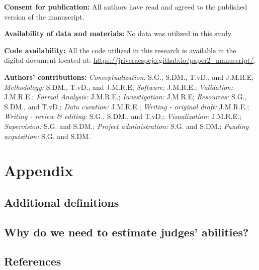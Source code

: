 \documentclass[
  authoryear,
  preprint,
  1p]{elsarticle}
\begin{document}
\textbf{Consent for publication:} All authors have read and agreed to
the published version of the manuscript.

\textbf{Availability of data and materials:} No data was utilized in
this study.

\textbf{Code availability:} All the code utilized in this research is
available in the digital document located at:
\url{https://jriveraespejo.github.io/paper2_manuscript/}.

\textbf{Authors' contributions:} \emph{Conceptualization:} S.G., S.DM.,
T.vD., and J.M.R.E; \emph{Methodology:} S.DM., T.vD., and J.M.R.E;
\emph{Software:} J.M.R.E.; \emph{Validation:} J.M.R.E.; \emph{Formal
Analysis:} J.M.R.E.; \emph{Investigation:} J.M.R.E; \emph{Resources:}
S.G., S.DM., and T.vD.; \emph{Data curation:} J.M.R.E.; \emph{Writing -
original draft:} J.M.R.E.; \emph{Writing - review \& editing:} S.G.,
S.DM., and T.vD.; \emph{Visualization:} J.M.R.E.; \emph{Supervision:}
S.G. and S.DM.; \emph{Project administration:} S.G. and S.DM.;
\emph{Funding acquisition:} S.G. and S.DM.

\newpage{}

\section{Appendix}\label{sec-appendix}

\subsection{Additional definitions}\label{sec-appA}

\subsection{Why do we need to estimate judges'
abilities?}\label{sec-appB}

\newpage{}

\subsection*{References}\label{references}

\renewcommand{\bibsection}{}

\end{document}
